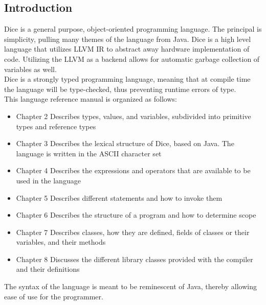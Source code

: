 \begin{homeworkProblem}
	\chapter{Introduction}
	Dice is a general purpose, object-oriented programming language. The principal is simplicity, pulling many themes of the language from Java. Dice is a high level language that utilizes LLVM IR to abstract away hardware implementation of code. Utilizing the LLVM as a backend allows for automatic garbage collection of variables as well. \\
	Dice is a strongly typed programming language, meaning that at compile time the language will be type-checked, thus preventing runtime errors of type. \\
	This language reference manual is organized as follows:\\
	\begin{itemize}
		\item Chapter 2 Describes types, values, and variables, subdivided into primitive types and reference types
		\item Chapter 3 Describes the lexical structure of Dice, based on Java. The language is written in the ASCII character set
		\item Chapter 4 Describes the expressions and operators that are available to be used in the language
		\item Chapter 5 Describes different statements and how to invoke them
		\item Chapter 6 Describes the structure of a program and how to determine scope
		\item Chapter 7 Describes classes, how they are defined, fields of classes or their variables, and their methods
		\item Chapter 8 Discusses the different library classes provided with the compiler and their definitions
	\end{itemize}
	The syntax of the language is meant to be reminescent of Java, thereby allowing ease of use for the programmer. 
\end{homeworkProblem}
